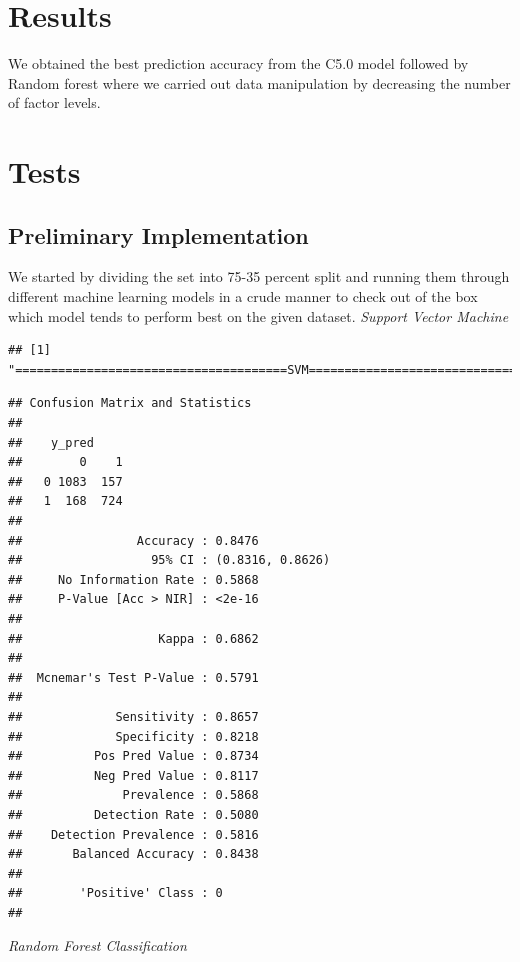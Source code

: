 \documentclass[
]{article}
\begin{document}
\section{Results}

We obtained the best prediction accuracy from the C5.0 model followed by
Random forest where we carried out data manipulation by decreasing the
number of factor levels.

\section{Tests}
\subsection{Preliminary Implementation}

We started by dividing the set into 75-35 percent split and running them
through different machine learning models in a crude manner to check out
of the box which model tends to perform best on the given dataset.
\emph{Support Vector Machine}

\begin{verbatim}
## [1] "======================================SVM====================================="
\end{verbatim}

\begin{verbatim}
## Confusion Matrix and Statistics
## 
##    y_pred
##        0    1
##   0 1083  157
##   1  168  724
##                                           
##                Accuracy : 0.8476          
##                  95% CI : (0.8316, 0.8626)
##     No Information Rate : 0.5868          
##     P-Value [Acc > NIR] : <2e-16          
##                                           
##                   Kappa : 0.6862          
##                                           
##  Mcnemar's Test P-Value : 0.5791          
##                                           
##             Sensitivity : 0.8657          
##             Specificity : 0.8218          
##          Pos Pred Value : 0.8734          
##          Neg Pred Value : 0.8117          
##              Prevalence : 0.5868          
##          Detection Rate : 0.5080          
##    Detection Prevalence : 0.5816          
##       Balanced Accuracy : 0.8438          
##                                           
##        'Positive' Class : 0               
## 
\end{verbatim}

\emph{Random Forest Classification}
\end{document}
